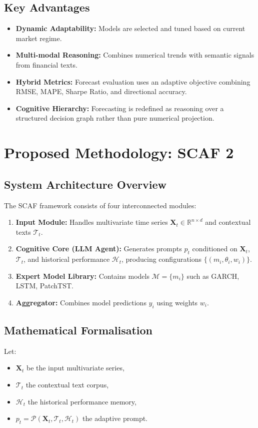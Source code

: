 \documentclass[conference]{IEEEtran}
\begin{document}
\subsection{Key Advantages}
\begin{itemize}
    \item \textbf{Dynamic Adaptability:} Models are selected and tuned based on current market regime.
    \item \textbf{Multi-modal Reasoning:} Combines numerical trends with semantic signals from financial texts.
    \item \textbf{Hybrid Metrics:} Forecast evaluation uses an adaptive objective combining RMSE, MAPE, Sharpe Ratio, and directional accuracy.
    \item \textbf{Cognitive Hierarchy:} Forecasting is redefined as reasoning over a structured decision graph rather than pure numerical projection.
\end{itemize}
\section{Proposed Methodology: SCAF 2}

\subsection{System Architecture Overview}
The SCAF framework consists of four interconnected modules:
\begin{enumerate}
    \item \textbf{Input Module:} Handles multivariate time series $\mathbf{X}_t \in \mathbb{R}^{n \times d}$ and contextual texts $\mathcal{T}_t$.
    \item \textbf{Cognitive Core (LLM Agent):} Generates prompts $p_t$ conditioned on $\mathbf{X}_t$, $\mathcal{T}_t$, and historical performance $\mathcal{H}_t$, producing configurations $\{(m_i, \theta_i, w_i)\}$.
    \item \textbf{Expert Model Library:} Contains models $\mathcal{M} = \{m_i\}$ such as GARCH, LSTM, PatchTST.
    \item \textbf{Aggregator:} Combines model predictions $\hat{y}_i$ using weights $w_i$.
\end{enumerate}

\subsection{Mathematical Formalisation}
Let:
\begin{itemize}
    \item $\mathbf{X}_t$ be the input multivariate series,
    \item $\mathcal{T}_t$ the contextual text corpus,
    \item $\mathcal{H}_t$ the historical performance memory,
    \item $p_t = \mathcal{P}(\mathbf{X}_t, \mathcal{T}_t, \mathcal{H}_t)$ the adaptive prompt.
\end{itemize}
\end{document}
